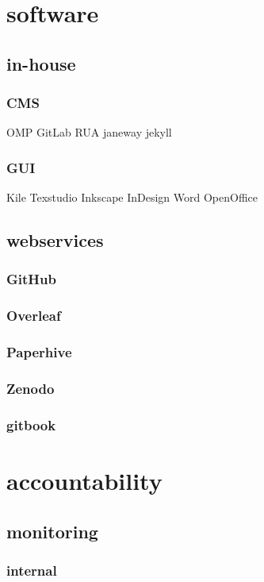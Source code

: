 \documentclass[output=guidelines,guidelines] {langscibook}
\begin{document}
\section{software}
\subsection{in-house}
\subsubsection{CMS}
                    OMP
                    GitLab
                    RUA
                    janeway
                    jekyll
\subsubsection{GUI}
                    Kile
                    Texstudio
                    Inkscape
                    InDesign
                    Word
                    OpenOffice
\subsection{webservices}
\subsubsection{GitHub}
\subsubsection{Overleaf}
\subsubsection{Paperhive}
\subsubsection{Zenodo}
\subsubsection{gitbook}
\section{accountability}
\subsection{monitoring}
\subsubsection{internal}
\end{document}

